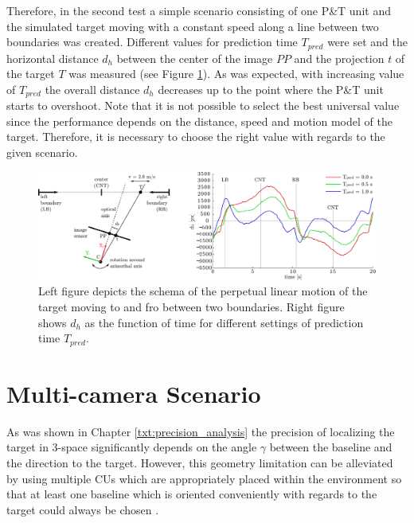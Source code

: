 Therefore, in the second test a simple scenario consisting of one P\&T unit and the simulated target moving with a constant speed along a line between two boundaries was created. Different values for prediction time $T_{pred}$ were set and the horizontal distance $d_{h}$ between the center of the image $PP$ and the projection $t$ of the target $T$ was measured (see Figure \ref{fig:test_motion_predict}). As was expected, with increasing value of $T_{pred}$ the overall distance $d_{h}$ decreases up to the point where the P\&T unit starts to overshoot. Note that it is not possible to select the best universal value since the performance depends on the distance, speed and motion model of the target. Therefore, it is necessary to choose the right value with regards to the given scenario.

\begin{figure}[htb]\centering
	\centering
	\includegraphics[width=0.95\linewidth]{fig/schema_defile_and_motion_prediction.pdf}
	\caption{Left figure depicts the schema of the perpetual linear motion of the target moving to and fro between two boundaries. Right figure shows $d_{h}$ as the function of time for different settings of prediction time $T_{pred}$.}
	\label{fig:test_motion_predict}
\end{figure}

\section{Multi-camera Scenario} \label{txt:multi-camera_scenario}

As was shown in Chapter \ref{txt:precision_analysis} the precision of localizing the target in 3-space significantly depends on the angle $\gamma$ between the baseline and the direction to the target. However, this geometry limitation can be alleviated by using multiple CUs which are appropriately placed within the environment so that at least one baseline which is oriented conveniently with regards to the target could always be chosen .

